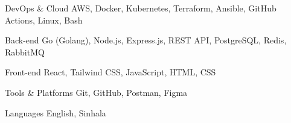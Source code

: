 
\begin{cvskills}

  \cvskill
    {DevOps \& Cloud} %
    {AWS, Docker, Kubernetes, Terraform, Ansible, GitHub Actions, Linux, Bash} %

  \cvskill
    {Back-end} %
    {Go (Golang), Node.js, Express.js, REST API, PostgreSQL, Redis, RabbitMQ} %

  \cvskill
    {Front-end} %
    {React, Tailwind CSS, JavaScript, HTML, CSS} %

  \cvskill
    {Tools \& Platforms} %
    {Git, GitHub, Postman, Figma} %

  \cvskill
    {Languages} %
    {English, Sinhala} %

\end{cvskills}
